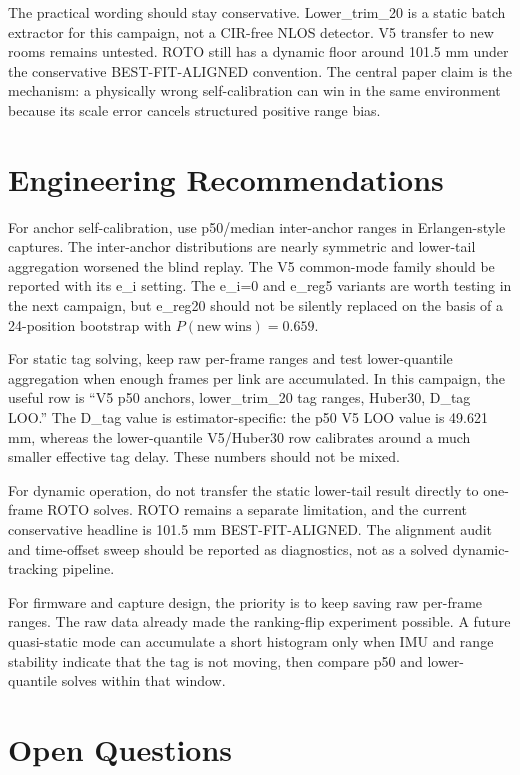 \documentclass[11pt,a4paper]{article}
\begin{document}
The practical wording should stay conservative. Lower\_trim\_20 is a static batch extractor for this campaign, not a CIR-free NLOS detector. V5 transfer to new rooms remains untested. ROTO still has a dynamic floor around 101.5 mm under the conservative BEST-FIT-ALIGNED convention. The central paper claim is the mechanism: a physically wrong self-calibration can win in the same environment because its scale error cancels structured positive range bias.

\section{Engineering Recommendations}

For anchor self-calibration, use p50/median inter-anchor ranges in Erlangen-style captures. The inter-anchor distributions are nearly symmetric and lower-tail aggregation worsened the blind replay. The V5 common-mode family should be reported with its e\_i setting. The e\_i=0 and e\_reg5 variants are worth testing in the next campaign, but e\_reg20 should not be silently replaced on the basis of a 24-position bootstrap with $P(\mathrm{new\ wins})=0.659$.

For static tag solving, keep raw per-frame ranges and test lower-quantile aggregation when enough frames per link are accumulated. In this campaign, the useful row is ``V5 p50 anchors, lower\_trim\_20 tag ranges, Huber30, D\_tag LOO.'' The D\_tag value is estimator-specific: the p50 V5 LOO value is 49.621 mm, whereas the lower-quantile V5/Huber30 row calibrates around a much smaller effective tag delay. These numbers should not be mixed.

For dynamic operation, do not transfer the static lower-tail result directly to one-frame ROTO solves. ROTO remains a separate limitation, and the current conservative headline is 101.5 mm BEST-FIT-ALIGNED. The alignment audit and time-offset sweep should be reported as diagnostics, not as a solved dynamic-tracking pipeline.

For firmware and capture design, the priority is to keep saving raw per-frame ranges. The raw data already made the ranking-flip experiment possible. A future quasi-static mode can accumulate a short histogram only when IMU and range stability indicate that the tag is not moving, then compare p50 and lower-quantile solves within that window.

\section{Open Questions}
\end{document}
